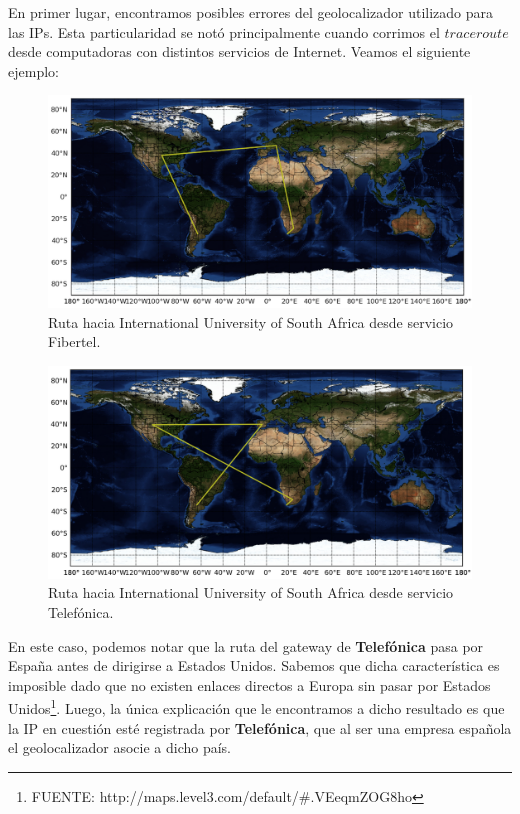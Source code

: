 \documentclass[10pt, a4paper]{article}
\begin{document}
En primer lugar, encontramos posibles errores del geolocalizador utilizado para las IPs. Esta particularidad se notó principalmente cuando corrimos el $traceroute$ desde computadoras con distintos servicios de Internet. Veamos el siguiente ejemplo:

\begin{figure}[H] %
\begin{center}
\includegraphics[width=400pt]{../imgs/map-unisa.png}
\caption{Ruta hacia International University of South Africa desde servicio Fibertel.}
\end{center}
\end{figure}

\begin{figure}[H] %
\begin{center}
\includegraphics[width=400pt]{../imgs/map-unisa(telef).png}
\caption{Ruta hacia International University of South Africa desde servicio Telefónica.}
\end{center}
\end{figure}

En este caso, podemos notar que la ruta del gateway de \textbf{Telefónica} pasa por España antes de dirigirse a Estados Unidos. Sabemos que dicha característica es imposible dado que no existen enlaces directos a Europa sin pasar por Estados Unidos\footnote{FUENTE: http://maps.level3.com/default/\#.VEeqmZOG8ho}. Luego, la única explicación que le encontramos a dicho resultado es que la IP en cuestión esté registrada por \textbf{Telefónica}, que al ser una empresa española el geolocalizador asocie a dicho país.
\end{document}
